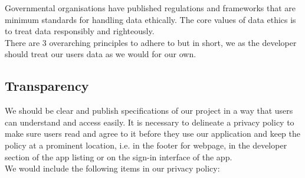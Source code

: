 Governmental organisations have published regulations  and frameworks
 that are minimum standards for handling data ethically. The core values of data ethics 
is to treat data responsibly and righteously.
\\
There are 3 overarching principles to adhere to but in short, we as the developer should treat our 
users\textsc{} data as we would for our own.

\subsection{Transparency}
We should be clear and publish specifications of our project in a way that users can understand and access
easily. It is necessary to delineate a privacy policy to make sure users read and agree to it before they use
our application and keep the policy at a prominent location, i.e. in the footer for webpage, in the developer
section of the app listing or on the sign-in interface of the app.\\We would include the following items in our privacy policy:

